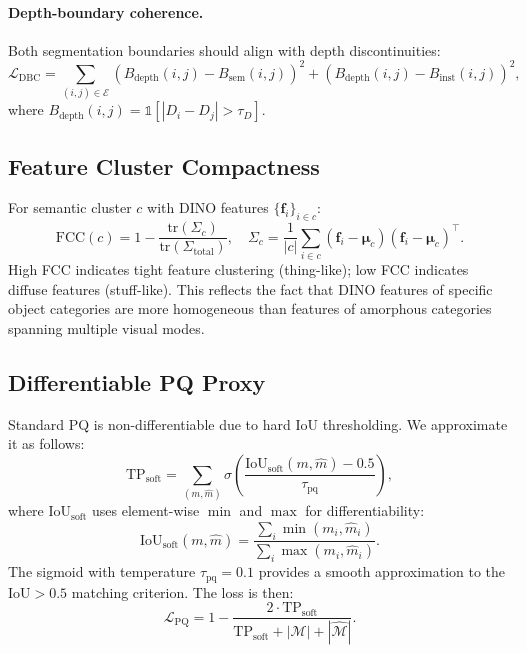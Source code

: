 \documentclass[10pt,twocolumn,letterpaper]{article}
\newcommand{\lpq}{\mathcal{L}_{\text{PQ}}}
\begin{document}
\paragraph{Depth-boundary coherence.}
Both segmentation boundaries should align with depth discontinuities:
\begin{equation}
\mathcal{L}_{\text{DBC}} = \!\sum_{(i,j) \in \mathcal{E}}\! (B_{\text{depth}}(i,j) - B_{\text{sem}}(i,j))^2 + (B_{\text{depth}}(i,j) - B_{\text{inst}}(i,j))^2,
\end{equation}
where $B_{\text{depth}}(i,j) = \mathbb{1}[|D_i - D_j| > \tau_D]$.


\subsection{Feature Cluster Compactness}
\label{sec:supp_fcc}

For semantic cluster $c$ with DINO features $\{\mathbf{f}_i\}_{i \in c}$:
\begin{equation}
\text{FCC}(c) = 1 - \frac{\text{tr}(\Sigma_c)}{\text{tr}(\Sigma_{\text{total}})}, \quad \Sigma_c = \frac{1}{|c|}\sum_{i \in c}(\mathbf{f}_i - \boldsymbol{\mu}_c)(\mathbf{f}_i - \boldsymbol{\mu}_c)^\top.
\end{equation}
High FCC indicates tight feature clustering (thing-like); low FCC indicates diffuse features (stuff-like). This reflects the fact that DINO features of specific object categories are more homogeneous than features of amorphous categories spanning multiple visual modes.


\subsection{Differentiable PQ Proxy}
\label{sec:supp_pq}

Standard PQ is non-differentiable due to hard IoU thresholding. We approximate it as follows:
\begin{equation}
\text{TP}_{\text{soft}} = \sum_{(m, \hat{m})} \sigma\!\left(\frac{\text{IoU}_{\text{soft}}(m, \hat{m}) - 0.5}{\tau_{\text{pq}}}\right),
\end{equation}
where $\text{IoU}_{\text{soft}}$ uses element-wise $\min$ and $\max$ for differentiability:
\begin{equation}
\text{IoU}_{\text{soft}}(m, \hat{m}) = \frac{\sum_i \min(m_i, \hat{m}_i)}{\sum_i \max(m_i, \hat{m}_i)}.
\end{equation}
The sigmoid with temperature $\tau_{\text{pq}} = 0.1$ provides a smooth approximation to the $\text{IoU} > 0.5$ matching criterion. The loss is then:
\begin{equation}
\lpq = 1 - \frac{2 \cdot \text{TP}_{\text{soft}}}{\text{TP}_{\text{soft}} + |\mathcal{M}| + |\hat{\mathcal{M}}|}.
\end{equation}
\end{document}
